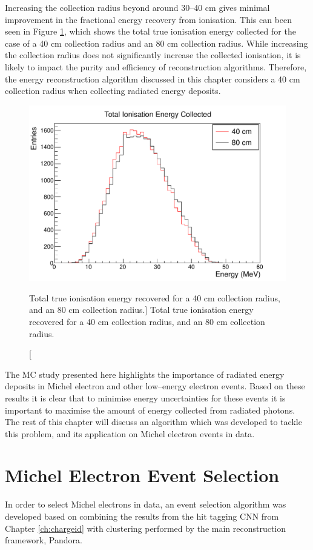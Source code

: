 Increasing the collection radius beyond around 30--40 cm gives minimal
improvement in the fractional energy recovery from ionisation. This can been
seen in Figure \ref{fig:40_v_80}, which shows the total true ionisation energy
collected for the case of a 40 cm collection radius and an 80 cm collection
radius. While increasing the collection radius does not significantly increase
the collected ionisation, it is likely to impact the purity and efficiency of 
reconstruction algorithms. Therefore, the energy reconstruction algorithm 
discussed in this chapter considers a 40 cm collection radius when collecting 
radiated energy deposits.
\begin{figure}
	\centering
	\includegraphics[width=\textwidth]{figures/40_v_80.pdf}
	\caption
	[Total true ionisation energy recovered for a 40 cm collection radius, and an
	80 cm collection radius.]
	{ Total true ionisation energy recovered for a 40 cm collection radius, and an
	80 cm collection radius. }
	\label{fig:40_v_80}
\end{figure}

The MC study presented here highlights the importance of radiated energy
deposits in Michel electron and other low--energy electron events. Based on
these results it is clear that to minimise energy uncertainties for these events
it is important to maximise the amount of energy collected from radiated 
photons. The rest of this chapter will discuss an algorithm which was developed 
to tackle this problem, and its application on Michel electron events in 
\protodune{} data.

\section{Michel Electron Event Selection} \label{ME_ES}
In order to select Michel electrons in \protodune{} data, an event selection
algorithm was developed based on combining the results from the hit tagging CNN 
from Chapter \ref{ch:chargeid} with clustering performed by the main 
\protodune{} reconstruction framework, Pandora. 

